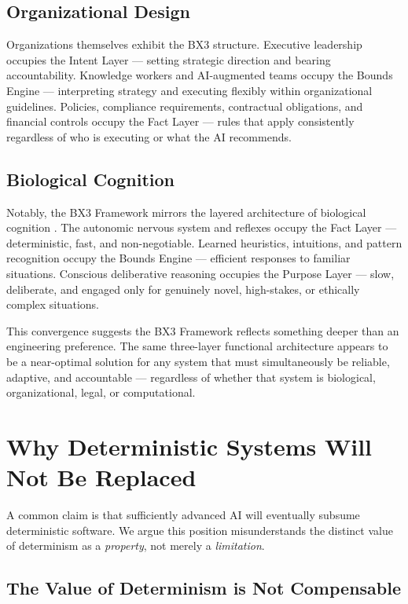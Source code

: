 \documentclass[12pt]{article}
\begin{document}
\subsection{Organizational Design}

Organizations themselves exhibit the BX3 structure. Executive leadership occupies the Intent Layer --- setting strategic direction and bearing accountability. Knowledge workers and AI-augmented teams occupy the Bounds Engine --- interpreting strategy and executing flexibly within organizational guidelines. Policies, compliance requirements, contractual obligations, and financial controls occupy the Fact Layer --- rules that apply consistently regardless of who is executing or what the AI recommends.

\subsection{Biological Cognition}

Notably, the BX3 Framework mirrors the layered architecture of biological cognition \cite{kahneman2011}. The autonomic nervous system and reflexes occupy the Fact Layer --- deterministic, fast, and non-negotiable. Learned heuristics, intuitions, and pattern recognition occupy the Bounds Engine --- efficient responses to familiar situations. Conscious deliberative reasoning occupies the Purpose Layer --- slow, deliberate, and engaged only for genuinely novel, high-stakes, or ethically complex situations.

This convergence suggests the BX3 Framework reflects something deeper than an engineering preference. The same three-layer functional architecture appears to be a near-optimal solution for any system that must simultaneously be reliable, adaptive, and accountable --- regardless of whether that system is biological, organizational, legal, or computational.

\section{Why Deterministic Systems Will Not Be Replaced}
\label{sec:determinism}

A common claim is that sufficiently advanced AI will eventually subsume deterministic software. We argue this position misunderstands the distinct value of determinism as a \textit{property}, not merely a \textit{limitation}.

\subsection{The Value of Determinism is Not Compensable}
\end{document}
